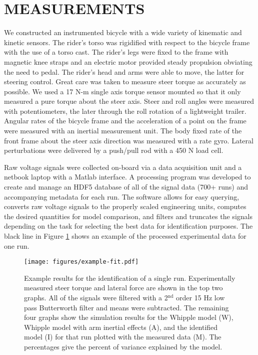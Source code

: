 \documentclass[twocolumn,10pt]{asme2e}
\begin{document}
\section*{MEASUREMENTS}
We constructed an instrumented bicycle with a wide variety of kinematic and
kinetic sensors. The rider's torso was rigidified with respect to the bicycle
frame with the use of a torso cast. The rider's legs were fixed to the frame
with magnetic knee straps and an electric motor provided steady propulsion
obviating the need to pedal. The rider's head and arms were able to move, the
latter for steering control. Great care was taken to measure steer torque as
accurately as possible. We used a 17 N-m single axis torque sensor mounted so
that it only measured a pure torque about the steer axis. Steer and roll angles
were measured with potentiometers, the later through the roll rotation of a
lightweight trailer. Angular rates of the bicycle frame and the acceleration of
a point on the frame were measured with an inertial measurement unit. The body
fixed rate of the front frame about the steer axis direction was measured with
a rate gyro. Lateral perturbations were delivered by a push/pull rod with a 450
N load cell.

Raw voltage signals were collected on-board via a data acquisition unit and a
netbook laptop with a Matlab interface. A processing program was developed to
create and manage an HDF5 database of all of the signal data (700+ runs) and
accompanying metadata for each run. The software allows for easy querying,
converts raw voltage signals to the properly scaled engineering units, computes
the desired quantities for model comparison, and filters and truncates the
signals depending on the task for selecting the best data for identification
purposes. The black line in Figure \ref{fig:exampleFit} shows an example of the
processed experimental data for one run.
%
\begin{figure}
	\texttt{[image: figures/example-fit.pdf]}
	\caption{Example results for the identification of a single run.
	Experimentally measured steer torque and lateral force are shown in the top
	two graphs. All of the signals were filtered with a 2$^\textrm{nd}$ order 15
	Hz low pass Butterworth filter and means were subtracted. The remaining four
	graphs show the simulation results for the Whipple model (W), Whipple model
	with arm inertial effects (A), and the identified model (I) for that run
	plotted with the measured data (M). The percentages give the percent of
	variance explained by the model.}
	\label{fig:exampleFit}
\end{figure}
%
\end{document}
